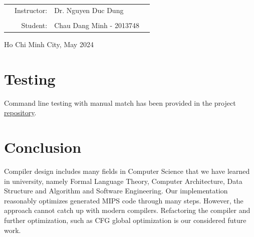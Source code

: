 \documentclass[a4paper]{report}
\begin{document}
\begin{titlepage}
  \begin{table}[h]
    \begin{tabular}{rrll}

      \hspace{5 cm}
       & Instructor: & Dr. Nguyen Duc Dung      \\
       &             &                          \\
       & Student:    & Chau Dang Minh - 2013748 \\
    \end{tabular}
  \end{table}
  \vspace{2cm}
  \begin{center}
    {\footnotesize Ho Chi Minh City, May 2024}
  \end{center}
\end{titlepage}
\tableofcontents
\newpage



\section{Testing}
Command line testing with manual match has been provided in the project \href{https://github.com/mintcd/compiler-design.git}{repository}.

\section{Conclusion}
Compiler design includes many fields in Computer Science that we have learned in university, namely Formal Language Theory, Computer Architecture, Data Structure and Algorithm and Software Engineering. Our implementation reasonably optimizes generated MIPS code through many steps. However, the approach cannot catch up with modern compilers. Refactoring the compiler and further optimization, such as CFG global optimization is our considered future work.
\end{document}

